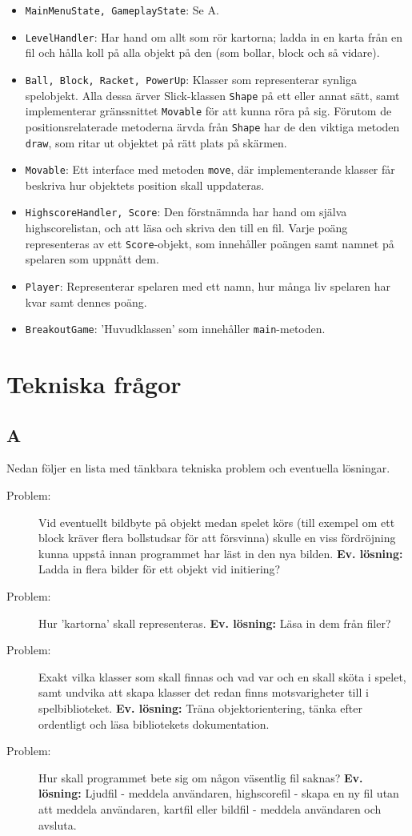 \documentclass[11pt,a4paper]{article}
\begin{document}
\begin{itemize}
	\item \texttt{MainMenuState, GameplayState}: Se A.
	\item \texttt{LevelHandler}: Har hand om allt som rör kartorna; ladda in en karta från en fil och hålla koll på alla objekt på den (som bollar, block och så vidare).
	\item \texttt{Ball, Block, Racket, PowerUp}: Klasser som representerar synliga spelobjekt. Alla dessa ärver Slick-klassen \texttt{Shape} på ett eller annat sätt, samt implementerar gränssnittet \texttt{Movable} för att kunna röra på sig. Förutom de positionsrelaterade metoderna ärvda från \texttt{Shape} har de den viktiga metoden \texttt{draw}, som ritar ut objektet på rätt plats på skärmen.
	\item \texttt{Movable}: Ett interface med metoden \texttt{move}, där implementerande klasser får beskriva hur objektets position skall uppdateras.
	\item \texttt{HighscoreHandler, Score}: Den förstnämnda har hand om själva highscorelistan, och att läsa och skriva den till en fil. Varje poäng representeras av ett \texttt{Score}-objekt, som innehåller poängen samt namnet på spelaren som uppnått dem.
	\item \texttt{Player}: Representerar spelaren med ett namn, hur många liv spelaren har kvar samt dennes poäng.
	\item \texttt{BreakoutGame}: 'Huvudklassen' som innehåller \texttt{main}-metoden.
\end{itemize}

\section{Tekniska frågor}

\subsection{A}
Nedan följer en lista med tänkbara tekniska problem och eventuella lösningar.
\begin{description}
	\item[Problem:] Vid eventuellt bildbyte på objekt medan spelet körs (till exempel om ett block kräver flera bollstudsar för att försvinna) skulle en viss fördröjning kunna uppstå innan programmet har läst in den nya bilden. \textbf{Ev. lösning:} Ladda in flera bilder för ett objekt vid initiering?
	\item[Problem:] Hur 'kartorna' skall representeras. \textbf{Ev. lösning:} Läsa in dem från filer?
	\item[Problem:] Exakt vilka klasser som skall finnas och vad var och en skall sköta i spelet, samt undvika att skapa klasser det redan finns motsvarigheter till i spelbiblioteket. \textbf{Ev. lösning:} Träna objektorientering, tänka efter ordentligt och läsa bibliotekets dokumentation.
	\item[Problem:] Hur skall programmet bete sig om någon väsentlig fil saknas? \textbf{Ev. lösning:} Ljudfil - meddela användaren, highscorefil - skapa en ny fil utan att meddela användaren, kartfil eller bildfil - meddela användaren och avsluta.
\end{description}
\end{document}
